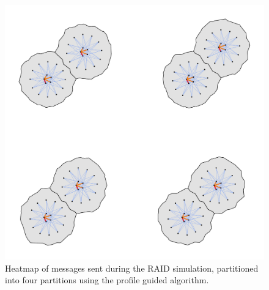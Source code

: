 \documentclass[11pt]{book}
\begin{document}
\begin{figure}
\centering
\includegraphics[width=\textwidth,height=0.9\textheight,keepaspectratio]{figs/RAID_4part}
\caption{Heatmap of messages sent during the RAID simulation, partitioned into four partitions using the profile guided algorithm.}
\end{figure}
\end{document}
